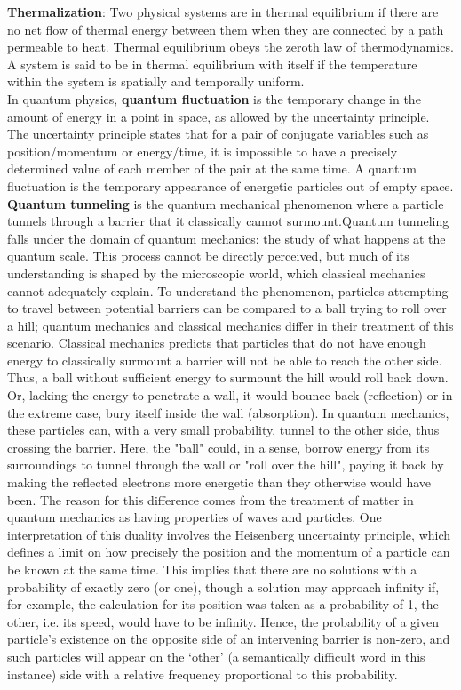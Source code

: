 \documentclass{article}
\begin{document}
\textbf{Thermalization}: Two physical systems are in thermal equilibrium if there are no net flow of thermal energy between them when they are connected by a path permeable to heat. Thermal equilibrium obeys the zeroth law of thermodynamics. A system is said to be in thermal equilibrium with itself if the temperature within the system is spatially and temporally uniform. \\

In quantum physics, \textbf{quantum fluctuation} is the temporary change in the amount of energy in a point in space, as allowed by the uncertainty principle. The uncertainty principle states that for a pair of conjugate variables such as position/momentum or energy/time, it is impossible to have a precisely determined value of each member of the pair at the same time. A quantum fluctuation is the temporary appearance of energetic particles out of empty space. \\

\textbf{Quantum tunneling} is the quantum mechanical phenomenon where a particle tunnels through a barrier that it classically cannot surmount.Quantum tunneling falls under the domain of quantum mechanics: the study of what happens at the quantum scale. This process cannot be directly perceived, but much of its understanding is shaped by the microscopic world, which classical mechanics cannot adequately explain. To understand the phenomenon, particles attempting to travel between potential barriers can be compared to a ball trying to roll over a hill; quantum mechanics and classical mechanics differ in their treatment of this scenario. Classical mechanics predicts that particles that do not have enough energy to classically surmount a barrier will not be able to reach the other side. Thus, a ball without sufficient energy to surmount the hill would roll back down. Or, lacking the energy to penetrate a wall, it would bounce back (reflection) or in the extreme case, bury itself inside the wall (absorption). In quantum mechanics, these particles can, with a very small probability, tunnel to the other side, thus crossing the barrier. Here, the "ball" could, in a sense, borrow energy from its surroundings to tunnel through the wall or "roll over the hill", paying it back by making the reflected electrons more energetic than they otherwise would have been. The reason for this difference comes from the treatment of matter in quantum mechanics as having properties of waves and particles. One interpretation of this duality involves the Heisenberg uncertainty principle, which defines a limit on how precisely the position and the momentum of a particle can be known at the same time. This implies that there are no solutions with a probability of exactly zero (or one), though a solution may approach infinity if, for example, the calculation for its position was taken as a probability of 1, the other, i.e. its speed, would have to be infinity. Hence, the probability of a given particle's existence on the opposite side of an intervening barrier is non-zero, and such particles will appear on the `other' (a semantically difficult word in this instance) side with a relative frequency proportional to this probability. \\ 
\end{document}

